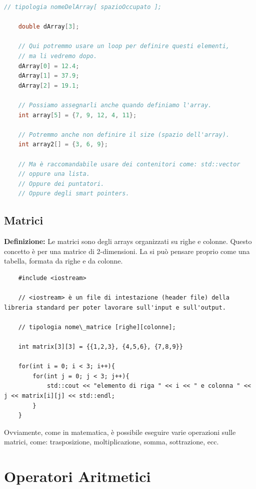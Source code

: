 \begin{lstlisting}[language=C++]
	// tipologia nomeDelArray[ spazioOccupato ];
	
	double dArray[3];
	
	// Qui potremmo usare un loop per definire questi elementi, 
	// ma li vedremo dopo.
	dArray[0] = 12.4;
	dArray[1] = 37.9;
	dArray[2] = 19.1;
	
	// Possiamo assegnarli anche quando definiamo l'array.
	int array[5] = {7, 9, 12, 4, 11};
	
	// Potremmo anche non definire il size (spazio dell'array).
	int array2[] = {3, 6, 9};
	
	// Ma è raccomandabile usare dei contenitori come: std::vector 
	// oppure una lista.
	// Oppure dei puntatori.
	// Oppure degli smart pointers.
\end{lstlisting}

\subsection{Matrici}

\textsf{\small \textbf{Definizione: } Le matrici sono degli arrays organizzati su righe e colonne. Questo concetto è per una matrice di 2-dimensioni. La si può pensare proprio come una tabella, formata da righe e da colonne.} \\

\begin{lstlisting}
	#include <iostream> 
	
	// <iostream> è un file di intestazione (header file) della libreria standard per poter lavorare sull'input e sull'output.
	
	// tipologia nome\_matrice [righe][colonne];
	
	int matrix[3][3] = {{1,2,3}, {4,5,6}, {7,8,9}}
	
	for(int i = 0; i < 3; i++){
		for(int j = 0; j < 3; j++){
			std::cout << "elemento di riga " << i << " e colonna " << j << matrix[i][j] << std::endl;
		}
	}
\end{lstlisting}

\textsf{\small Ovviamente, come in matematica, è possibile eseguire varie operazioni sulle matrici, come: trasposizione, moltiplicazione, somma, sottrazione, ecc.} \\ 


\section{Operatori Aritmetici}

